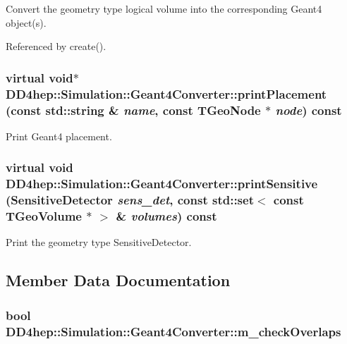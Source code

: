 Convert the geometry type logical volume into the corresponding Geant4 object(s). 

Referenced by create().\hypertarget{class_d_d4hep_1_1_simulation_1_1_geant4_converter_a4a2bbac335aeb3926bf3eb2c62803f74}{
\subsubsection[{printPlacement}]{\setlength{\rightskip}{0pt plus 5cm}virtual void$\ast$ DD4hep::Simulation::Geant4Converter::printPlacement (const std::string \& {\em name}, \/  const TGeoNode $\ast$ {\em node}) const}}
\label{class_d_d4hep_1_1_simulation_1_1_geant4_converter_a4a2bbac335aeb3926bf3eb2c62803f74}


Print Geant4 placement. \hypertarget{class_d_d4hep_1_1_simulation_1_1_geant4_converter_a0c4b85de4afdb9627b0adf76f033d4f5}{
\subsubsection[{printSensitive}]{\setlength{\rightskip}{0pt plus 5cm}virtual void DD4hep::Simulation::Geant4Converter::printSensitive ({\bf SensitiveDetector} {\em sens\_\-det}, \/  const std::set$<$ const TGeoVolume $\ast$ $>$ \& {\em volumes}) const}}
\label{class_d_d4hep_1_1_simulation_1_1_geant4_converter_a0c4b85de4afdb9627b0adf76f033d4f5}


Print the geometry type SensitiveDetector. 

\subsection{Member Data Documentation}
\hypertarget{class_d_d4hep_1_1_simulation_1_1_geant4_converter_a5afb918294afbed48b9c713f750fb017}{
\subsubsection[{m\_\-checkOverlaps}]{\setlength{\rightskip}{0pt plus 5cm}bool {\bf DD4hep::Simulation::Geant4Converter::m\_\-checkOverlaps}}}
\label{class_d_d4hep_1_1_simulation_1_1_geant4_converter_a5afb918294afbed48b9c713f750fb017}


